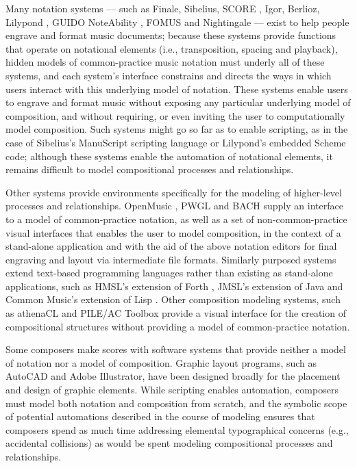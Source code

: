 \documentclass{article}
\begin{document}
Many notation systems --- such as Finale, Sibelius, SCORE \cite{Smith:1972mw},
Igor, Berlioz, Lilypond \cite{Nienhuys:2003ve}, GUIDO \cite{Hoos:1998bd}
NoteAbility \cite{hamel1noteability}, FOMUS \cite{Psenicka2006,Psenicka2009}
and Nightingale --- exist to help people engrave and format music documents;
because these systems provide functions that operate on notational elements
(i.e., transposition, spacing and playback), hidden models of common-practice
music notation must underly all of these systems, and each system's interface
constrains and directs the ways in which users interact with this underlying
model of notation. These systems enable users to engrave and format music
without exposing any particular underlying model of composition, and without
requiring, or even inviting the user to computationally model composition. Such
systems might go so far as to enable scripting, as in the case of Sibelius's
ManuScript \cite{Technology:qc} scripting language or Lilypond's embedded
Scheme code; although these systems enable the automation of notational
elements, it remains difficult to model compositional processes and
relationships.

Other systems provide environments specifically for the modeling of
higher-level processes and relationships. OpenMusic \cite{Assayag:1999sw}, PWGL
\cite{Laurson:2009qf} and BACH \cite{agostini2013real} supply an interface to a
model of common-practice notation, as well as a set of non-common-practice
visual interfaces that enables the user to model composition, in the context of
a stand-alone application and with the aid of the above notation editors for
final engraving and layout via intermediate file formats. Similarly purposed
systems extend text-based programming languages rather than existing as
stand-alone applications, such as HMSL's extension of Forth
\cite{Polansky:1990fk}, JMSL's extension of Java \cite{didkovsky2001java} and
Common Music's extension of Lisp \cite{taube1991common}. Other composition
modeling systems, such as athenaCL \cite{Ariza2005} and PILE/AC Toolbox
\cite{Berg1979} provide a visual interface for the creation of compositional
structures without providing a model of common-practice notation.

Some composers make scores with software systems that provide neither a model
of notation nor a model of composition. Graphic layout programs, such as
AutoCAD and Adobe Illustrator, have been designed broadly for the placement and
design of graphic elements. While scripting enables automation, composers must
model both notation and composition from scratch, and the symbolic scope of
potential automations described in the course of modeling ensures that
composers spend as much time addressing elemental typographical concerns (e.g.,
accidental collisions) as would be spent modeling compositional processes and
relationships.
\end{document}
